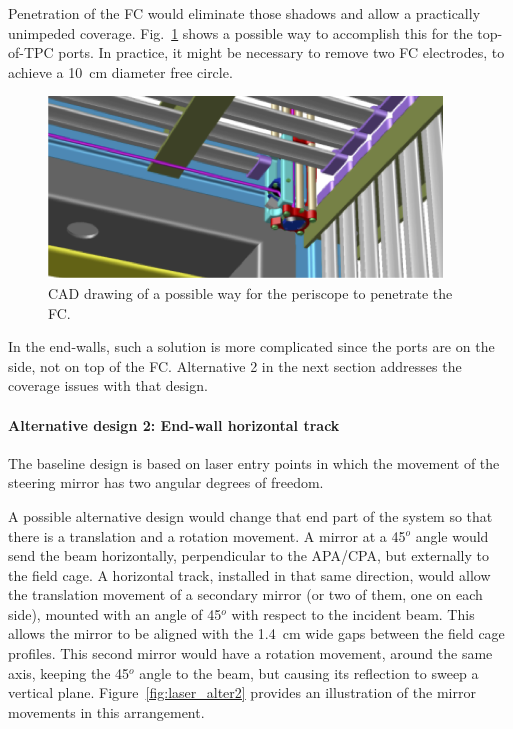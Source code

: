 Penetration of the FC would eliminate those shadows and allow a practically unimpeded coverage. Fig.~\ref{fig:laser_intofc} shows a possible way to accomplish this for the top-of-TPC ports. In practice, it might be necessary to remove two FC electrodes, to achieve a 10~cm diameter free circle. 

\begin{figure}[htb!] 
\centering 
\includegraphics[width=0.8\linewidth]{graphics/dune_laser_sbndstyle.png}
\caption{CAD drawing of a possible way for the periscope to penetrate the FC.}
\label{fig:laser_intofc} 
\end{figure} 

In the end-walls, such a solution is more complicated
since the ports are on the side, not on top of the FC. Alternative 2 in the next section addresses the coverage issues with that design.

\paragraph{Alternative design 2: End-wall horizontal track}

The baseline design is based on laser entry points in which the movement of the steering mirror has two angular degrees of freedom.
 
A possible alternative design would change that end part of the system so that there is a translation and a rotation movement. A mirror at a \num{45}$^{o}$ angle would send the beam horizontally, perpendicular to the APA/CPA, but externally to the field cage. A horizontal track, installed in that same direction, would allow the translation movement of a secondary mirror (or two of them, one on each side), mounted with an angle of \num{45}$^{o}$ with respect to the incident beam. This allows the mirror to be aligned with the \num{1.4}~cm wide gaps between the field cage profiles. This second mirror would have a rotation movement, around the same axis, keeping the \num{45}$^{o}$ angle to the beam, but causing its reflection to sweep a vertical plane. Figure~\ref{fig:laser_alter2} provides an illustration of the mirror movements in this arrangement.

